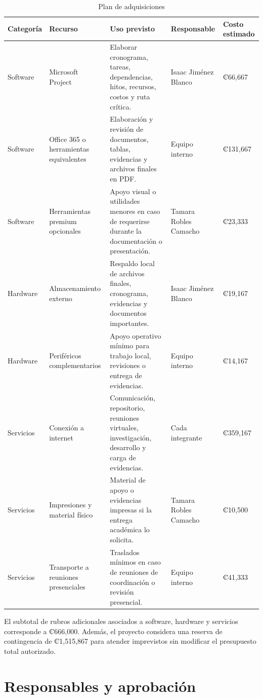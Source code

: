 \documentclass[11pt,spanish]{article}
\begin{document}
\begin{table}[H]
\centering
\caption{Plan de adquisiciones}
\label{tab:plan-adquisiciones}
{\scriptsize
\begin{tabularx}{\textwidth}{p{2.6cm} p{3.3cm} Y p{2.4cm} p{2.1cm}}
\toprule
\textbf{Categoría} & \textbf{Recurso} & \textbf{Uso previsto} & \textbf{Responsable} & \textbf{Costo estimado} \\
\midrule
Software & Microsoft Project & Elaborar cronograma, tareas, dependencias, hitos, recursos, costos y ruta crítica. & Isaac Jiménez Blanco & ₡66,667 \\
Software & Office 365 o herramientas equivalentes & Elaboración y revisión de documentos, tablas, evidencias y archivos finales en PDF. & Equipo interno & ₡131,667 \\
Software & Herramientas premium opcionales & Apoyo visual o utilidades menores en caso de requerirse durante la documentación o presentación. & Tamara Robles Camacho & ₡23,333 \\
Hardware & Almacenamiento externo & Respaldo local de archivos finales, cronograma, evidencias y documentos importantes. & Isaac Jiménez Blanco & ₡19,167 \\
Hardware & Periféricos complementarios & Apoyo operativo mínimo para trabajo local, revisiones o entrega de evidencias. & Equipo interno & ₡14,167 \\
Servicios & Conexión a internet & Comunicación, repositorio, reuniones virtuales, investigación, desarrollo y carga de evidencias. & Cada integrante & ₡359,167 \\
Servicios & Impresiones y material físico & Material de apoyo o evidencias impresas si la entrega académica lo solicita. & Tamara Robles Camacho & ₡10,500 \\
Servicios & Transporte a reuniones presenciales & Traslados mínimos en caso de reuniones de coordinación o revisión presencial. & Equipo interno & ₡41,333 \\
\bottomrule
\end{tabularx}
}
\end{table}

El subtotal de rubros adicionales asociados a software, hardware y servicios corresponde a ₡666,000. Además, el proyecto considera una reserva de contingencia de ₡1,515,867 para atender imprevistos sin modificar el presupuesto total autorizado.

\section{Responsables y aprobación}
\end{document}
